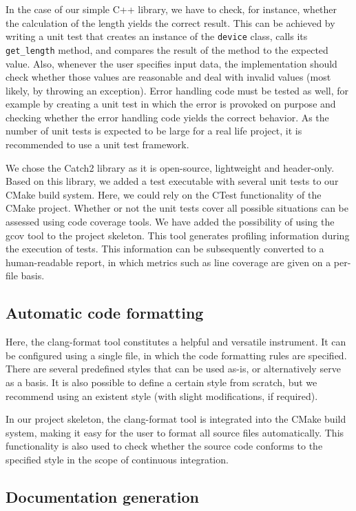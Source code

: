 \documentclass[@CLASSOPTIONS@]{tumarticle}
\begin{document}
In the case of our simple C++ library, we have to check, for instance,
whether the calculation of the length yields the correct result. This can be
achieved by writing a unit test that creates an instance of the
\texttt{device} class, calls its \texttt{get\_length} method, and compares
the result of the method to the expected value. Also, whenever the user
specifies input data, the implementation should check whether those values
are reasonable and deal with invalid values (most likely, by throwing an
exception). Error handling code must be tested as well, for example by
creating a unit test in which the error is provoked on purpose and checking
whether the error handling code yields the correct behavior. As the number
of unit tests is expected to be large for a real life project, it is
recommended to use a unit test framework.

We chose the Catch2 library as it is open-source, lightweight and header-only.
Based on this library, we added a test executable with several unit tests to
our CMake build system. Here, we could rely on the CTest functionality of the
CMake project. Whether or not the unit tests cover all possible situations
can be assessed using code coverage tools. We have added the possibility of
using the gcov tool to the project skeleton. This tool generates profiling
information during the execution of tests. This information can be
subsequently converted to a human-readable report, in which metrics such as
line coverage are given on a per-file basis.

\subsection{Automatic code formatting}

Here, the clang-format tool constitutes a helpful and versatile instrument.
It can be configured using a single file, in which the code formatting rules
are specified. There are several predefined styles that can be used as-is,
or alternatively serve as a basis. It is also possible to define a certain
style from scratch, but we recommend using an existent style (with slight
modifications, if required).

In our project skeleton, the clang-format tool is integrated into the CMake
build system, making it easy for the user to format all source files
automatically. This functionality is also used to check whether the source
code conforms to the specified style in the scope of continuous integration.

\subsection{Documentation generation}
\end{document}
